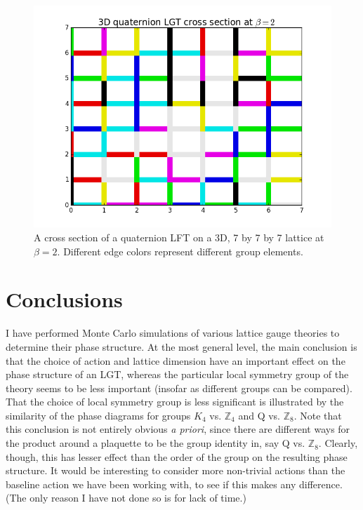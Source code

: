 \documentclass[9pt,twocolumn,twoside]{article}
\begin{document}
\begin{figure}[h!]
	\begin{centering}
	\includegraphics[width=\columnwidth]{qcrosssection}
	\caption{A cross section of a quaternion LFT on a 3D, 7 by 7 by 7 lattice at $\beta=2$.  Different edge colors represent different group elements.}
	\label{qcrosssection}
	\end{centering}
\end{figure}


\section{Conclusions}
I have performed Monte Carlo simulations of various lattice gauge theories to determine their phase structure.  At the most general level, the main conclusion is that the choice of action and lattice dimension have an important effect on the phase structure of an LGT, whereas the particular local symmetry group of the theory seems to be less important (insofar as different groups can be compared).  That the choice of local symmetry group is less significant is illustrated by the similarity of the phase diagrams for groups $K_4$ vs. $\mathbb{Z}_4$ and Q vs. $\mathbb{Z}_8$.  Note that this conclusion is not entirely obvious \textit{a priori}, since there are different ways for the product around a plaquette to be the group identity in, say Q vs. $\mathbb{Z}_8$.  Clearly, though, this has lesser effect than the order of the group on the resulting phase structure.  It would be interesting to consider more non-trivial actions than the baseline action we have been working with, to see if this makes any difference.  (The only reason I have not done so is for lack of time.)
\end{document}
